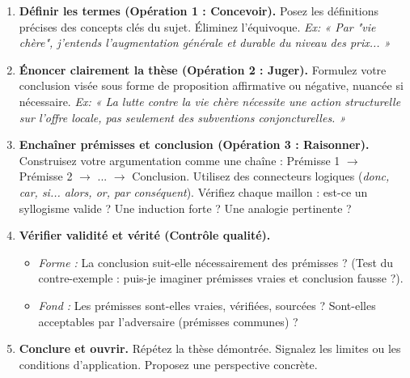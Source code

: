\documentclass[11pt]{article}
\begin{document}
\begin{methode}
\begin{enumerate}
    \item \textbf{Définir les termes (Opération 1 : Concevoir).} Posez les définitions précises des concepts clés du sujet. Éliminez l'équivoque. \textit{Ex: « Par "vie chère", j'entends l'augmentation générale et durable du niveau des prix... »}
    \item \textbf{Énoncer clairement la thèse (Opération 2 : Juger).} Formulez votre conclusion visée sous forme de proposition affirmative ou négative, nuancée si nécessaire. \textit{Ex: « La lutte contre la vie chère nécessite une action structurelle sur l'offre locale, pas seulement des subventions conjoncturelles. »}
    \item \textbf{Enchaîner prémisses et conclusion (Opération 3 : Raisonner).} Construisez votre argumentation comme une chaîne : Prémisse 1 $\rightarrow$ Prémisse 2 $\rightarrow$ ... $\rightarrow$ Conclusion. Utilisez des connecteurs logiques (\textit{donc, car, si... alors, or, par conséquent}). Vérifiez chaque maillon : est-ce un syllogisme valide ? Une induction forte ? Une analogie pertinente ?
    \item \textbf{Vérifier validité et vérité (Contrôle qualité).}
    \begin{itemize}
        \item \textit{Forme :} La conclusion suit-elle nécessairement des prémisses ? (Test du contre-exemple : puis-je imaginer prémisses vraies et conclusion fausse ?).
        \item \textit{Fond :} Les prémisses sont-elles vraies, vérifiées, sourcées ? Sont-elles acceptables par l'adversaire (prémisses communes) ?
    \end{itemize}
    \item \textbf{Conclure et ouvrir.} Répétez la thèse démontrée. Signalez les limites ou les conditions d'application. Proposez une perspective concrète.
\end{enumerate}
\end{methode}
\end{document}
